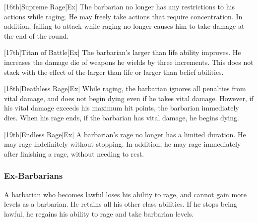         [16th]{Supreme Rage}[Ex]
        The barbarian no longer has any restrictions to his actions while raging.
        He may freely take actions that require concentration.
        In addition, failing to attack while raging no longer causes him to take damage at the end of the round.

        [17th]{Titan of Battle}[Ex]
        The barbarian's larger than life ability improves.
        He increases the damage die of weapons he wields by three increments.
        This does not stack with the effect of the larger than life or larger than belief abilities.

        [18th]{Deathless Rage}[Ex]
        While raging, the barbarian ignores all penalties from vital damage, and does not begin dying even if he takes vital damage.
        However, if his vital damage exceeds his maximum hit points, the barbarian immediately dies.
        When his rage ends, if the barbarian has vital damage, he begins dying.

        [19th]{Endless Rage}[Ex]
        A barbarian's rage no longer has a limited duration.
        He may rage indefinitely without stopping.
        In addition, he may rage immediately after finishing a rage, without needing to rest.

        \subsubsection{Ex-Barbarians}
            A barbarian who becomes lawful loses his ability to rage, and cannot gain more levels as a barbarian.
            He retains all his other class abilities.
            If he stops being lawful, he regains his ability to rage and take barbarian levels.

